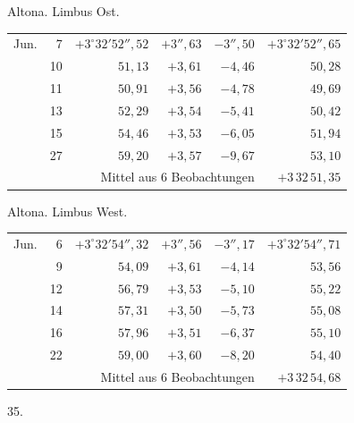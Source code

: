 \noindent\begin{minipage}[t]{.495\textwidth}\centering Altona. Limbus Ost.\par\smallskip
{\scriptsize\setlength{\tabcolsep}{1pt}\renewcommand{\arraystretch}{1.2}\begin{tabular}{lr|r|r|r|r|}
Jun.&7&$+3^\circ32'52''{,}52$&$+3''{,}63$&$-3''{,}50$&$+3^\circ32'52''{,}65$\\
&10&$51{,}13$&$+3{,}61$&$-4{,}46$&$50{,}28$\\
&11&$50{,}91$&$+3{,}56$&$-4{,}78$&$49{,}69$\\
&13&$52{,}29$&$+3{,}54$&$-5{,}41$&$50{,}42$\\
&15&$54{,}46$&$+3{,}53$&$-6{,}05$&$51{,}94$\\
&27&$59{,}20$&$+3{,}57$&$-9{,}67$&$53{,}10$\\
\cline{6-6}\multicolumn{5}{r}{Mittel aus 6 Beobachtungen}&$+3\,32\,51{,}35$
\end{tabular}}\end{minipage}\hfill\begin{minipage}[t]{.495\textwidth}\centering Altona. Limbus West.\par\smallskip
{\scriptsize\setlength{\tabcolsep}{1pt}\renewcommand{\arraystretch}{1.2}\begin{tabular}{lr|r|r|r|r}
Jun.&6&$+3^\circ32'54''{,}32$&$+3''{,}56$&$-3''{,}17$&$+3^\circ32'54''{,}71$\\
&9&$54{,}09$&$+3{,}61$&$-4{,}14$&$53{,}56$\\
&12&$56{,}79$&$+3{,}53$&$-5{,}10$&$55{,}22$\\
&14&$57{,}31$&$+3{,}50$&$-5{,}73$&$55{,}08$\\
&16&$57{,}96$&$+3{,}51$&$-6{,}37$&$55{,}10$\\
&22&$59{,}00$&$+3{,}60$&$-8{,}20$&$54{,}40$\\
\cline{6-6}\multicolumn{5}{r}{Mittel aus 6 Beobachtungen}&$+3\,32\,54{,}68$
\end{tabular}}\end{minipage}
\par\vspace{4mm}
\begin{center}35.\end{center}

